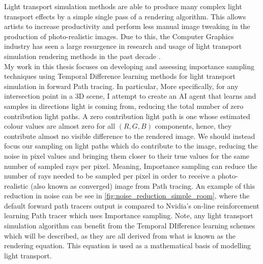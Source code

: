 \documentclass[../dissertation.tex]{subfiles}
\begin{document}
Light transport simulation methods are able to produce 
many complex light transport effects by a simple single pass of a rendering algorithm.
This allows artists to increase productivity and perform less manual image tweaking
in the production of photo-realistic images. Due to this, the Computer Graphics 
industry has seen a large resurgence in research and usage of light transport simulation 
rendering methods in the past decade \cite{krivanek2014recent}. \\

My work in this thesis focuses on developing and assessing importance sampling 
techniques using Temporal Difference learning methods for light transport simulation 
in forward Path tracing. In particular, More specifically,
for any intersection point in a 3D scene, I attempt to create an AI agent that learns 
and samples in  directions light is coming from, reducing the total number of 
zero contribution light paths. A zero contribution light path is one whose 
estimated colour values are almost zero for all $(R,G,B)$ components, hence,
they contribute almost no visible difference to the rendered image. We should 
instead focus our sampling on light paths which do contribute to the image,
reducing the noise in pixel values and bringing them closer to their true 
values for the same number of sampled rays per pixel. Meaning, Importance 
sampling can reduce the number of rays needed to be sampled per pixel in 
order to receive a photo-realistic (also known as converged) image from Path 
tracing. An example of this reduction in noise can be see in \ref{fig:noise_reduction_simple_room}, where the 
default forward path tracers output is compared to Nvidia's on-line
reinforcement learning Path tracer which uses Importance sampling. Note, any 
light transport simulation algorithm \cite{jensen1996global, keller2016path} can benefit from the Temporal DIfference learning
schemes which will be described, 
as they are all derived from what is known as the rendering equation. This equation
is used as a mathematical basis of modelling light transport.\\
\end{document}

